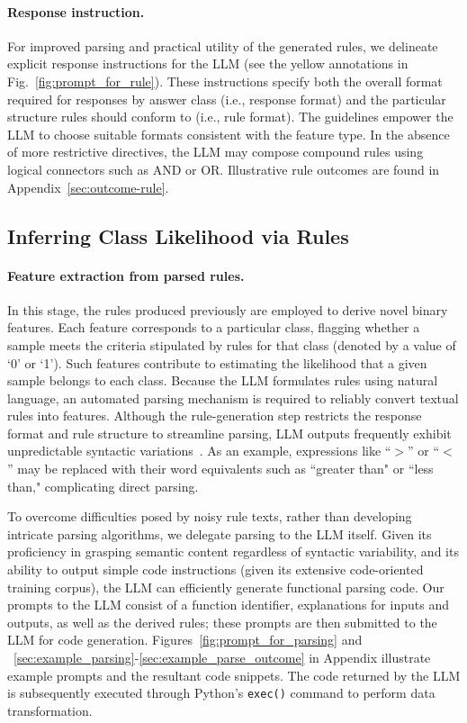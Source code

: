 \vspace*{-0.12in}
\paragraph{Response instruction.} For improved parsing and practical utility of the generated rules, we delineate explicit response instructions for the LLM (see the yellow annotations in Fig.~\ref{fig:prompt_for_rule}). These instructions specify both the overall format required for responses by answer class (i.e., response format) and the particular structure rules should conform to (i.e., rule format). The guidelines empower the LLM to choose suitable formats consistent with the feature type. In the absence of more restrictive directives, the LLM may compose compound rules using logical connectors such as AND or OR. Illustrative rule outcomes are found in Appendix~\ref{sec:outcome-rule}.

\subsection{Inferring Class Likelihood via Rules}
\label{Sec:training}

\paragraph{Feature extraction from parsed rules.} In this stage, the rules produced previously are employed to derive novel binary features. Each feature corresponds to a particular class, flagging whether a sample meets the criteria stipulated by rules for that class (denoted by a value of ‘0’ or ‘1’). Such features contribute to estimating the likelihood that a given sample belongs to each class. Because the LLM formulates rules using natural language, an automated parsing mechanism is required to reliably convert textual rules into features. Although the rule-generation step restricts the response format and rule structure to streamline parsing, LLM outputs frequently exhibit unpredictable syntactic variations~\cite{kovavc2023large}. As an example, expressions like ``$>$” or ``$<$” may be replaced with their word equivalents such as ``greater than" or ``less than," complicating direct parsing.

To overcome difficulties posed by noisy rule texts, rather than developing intricate parsing algorithms, we delegate parsing to the LLM itself. Given its proficiency in grasping semantic content regardless of syntactic variability, and its ability to output simple code instructions (given its extensive code-oriented training corpus), the LLM can efficiently generate functional parsing code. Our prompts to the LLM consist of a function identifier, explanations for inputs and outputs, as well as the derived rules; these prompts are then submitted to the LLM for code generation. Figures~\ref{fig:prompt_for_parsing} and ~\ref{sec:example_parsing}-\ref{sec:example_parse_outcome} in Appendix illustrate example prompts and the resultant code snippets. The code returned by the LLM is subsequently executed through Python's \texttt{exec()} command to perform data transformation.

